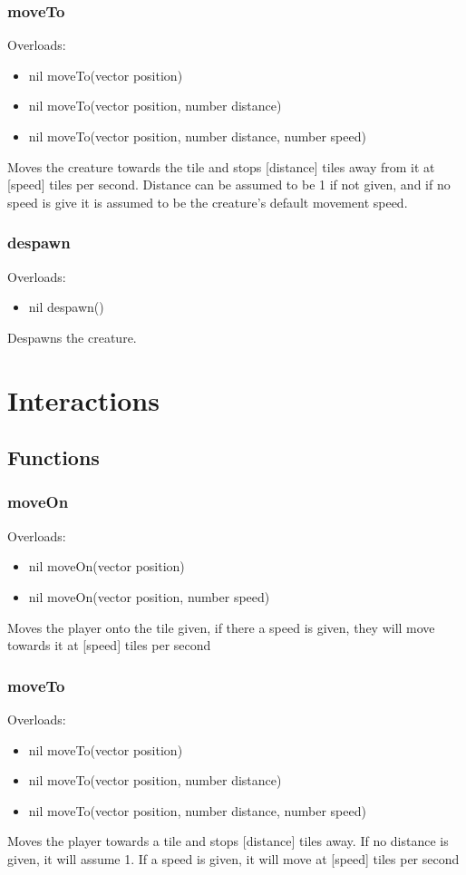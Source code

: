 \documentclass{book}
\newenvironment{ulist}
	{\begin{itemize}
			\itemsep0em}
	{\end{itemize}}
\begin{document}
\subsubsection{moveTo}
Overloads:
\begin{ulist}
	\item nil moveTo(vector position)
	\item nil moveTo(vector position, number distance)
	\item nil moveTo(vector position, number distance, number speed)
\end{ulist}
Moves the creature towards the tile and stops [distance] tiles away from it at [speed] tiles per second. Distance can be assumed to be 1 if not given, and if no speed is give it is assumed to be the creature's default movement speed.

\subsubsection{despawn}
Overloads:
\begin{ulist}
	\item nil despawn()
\end{ulist}
Despawns the creature.



\section{Interactions}
\subsection{Functions}
\subsubsection{moveOn}
Overloads:
\begin{ulist}
	\item nil moveOn(vector position)
	\item nil moveOn(vector position, number speed)	
\end{ulist}
Moves the player onto the tile given, if there a speed is given, they will move towards it at [speed] tiles per second

\subsubsection{moveTo}
Overloads:
\begin{ulist}
	\item nil moveTo(vector position)
	\item nil moveTo(vector position, number distance)
	\item nil moveTo(vector position, number distance, number speed)
\end{ulist}
Moves the player towards a tile and stops [distance] tiles away. If no distance is given, it will assume 1. If a speed is given, it will move at [speed] tiles per second
\end{document}
